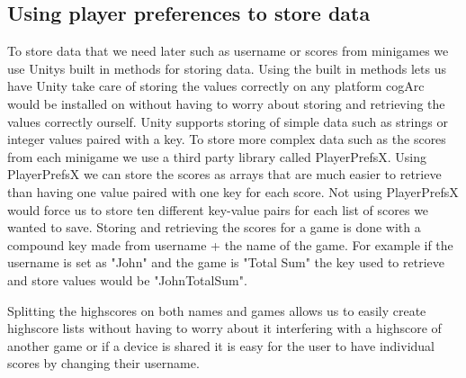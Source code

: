 \subsection{Using player preferences to store data}
To store data that we need later such as username or scores from minigames we use Unitys built in methods for storing data.
Using the built in methods lets us have Unity take care of storing the values correctly on any platform cogArc would be installed on without having to worry about 
storing and retrieving the values correctly ourself.
Unity supports storing of simple data such as strings or integer values paired with a key.
To store more complex data such as the scores from each minigame we use a third party library called PlayerPrefsX\cite{PlayerPrefsX}.
Using PlayerPrefsX we can store the scores as arrays that are much easier to retrieve than having one value paired with one key for each score.
Not using PlayerPrefsX would force us to store ten different key-value pairs for each list of scores we wanted to save.
Storing and retrieving the scores for a game is done with a compound key made from username + the name of the game.
For example if the username is set as "John" and the game is "Total Sum" the key used to retrieve and store values would be "JohnTotalSum".

Splitting the highscores on both names and games allows us to easily create highscore lists without having to worry about it interfering with
a highscore of another game or if a device is shared it is easy for the user to have individual scores by changing their username.
